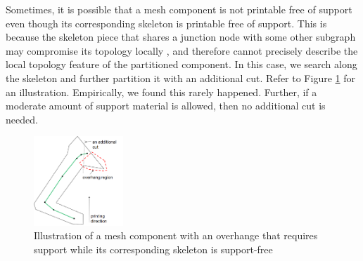 Sometimes, it is possible that a mesh component is not printable free of support even though its corresponding skeleton is printable free of support. This is because the skeleton piece that shares a junction node with some other subgraph may compromise its topology locally \cite{AuTCCL08}, and therefore cannot precisely describe the local topology feature of the partitioned component. In this case, we search along the skeleton and further partition it with an additional cut. Refer to Figure \ref{fig:arm} for an illustration. Empirically, we found this rarely happened. Further, if a moderate amount of support material is allowed, then no additional cut is needed.

\begin{figure}[tbp]
  \centering
  \includegraphics[width=0.3\textwidth]{figs/arm.png}
  \caption{\label{fig:arm}%
           Illustration of a mesh component with an overhange that requires support while its corresponding skeleton is support-free}
\end{figure}










